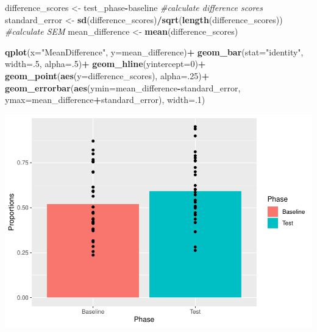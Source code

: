 \documentclass[]{book}
\newenvironment{Shaded}{\begin{snugshade}}{\end{snugshade}}
\newcommand{\KeywordTok}[1]{\textcolor[rgb]{0.13,0.29,0.53}{\textbf{#1}}}
\newcommand{\DataTypeTok}[1]{\textcolor[rgb]{0.13,0.29,0.53}{#1}}
\newcommand{\DecValTok}[1]{\textcolor[rgb]{0.00,0.00,0.81}{#1}}
\newcommand{\StringTok}[1]{\textcolor[rgb]{0.31,0.60,0.02}{#1}}
\newcommand{\CommentTok}[1]{\textcolor[rgb]{0.56,0.35,0.01}{\textit{#1}}}
\newcommand{\OperatorTok}[1]{\textcolor[rgb]{0.81,0.36,0.00}{\textbf{#1}}}
\newcommand{\NormalTok}[1]{#1}
\begin{document}
\begin{Shaded}
\begin{Highlighting}[]
\NormalTok{difference_scores <-}\StringTok{ }\NormalTok{test_phase}\OperatorTok{-}\NormalTok{baseline }\CommentTok{#calculate difference scores}
\NormalTok{standard_error <-}\StringTok{ }\KeywordTok{sd}\NormalTok{(difference_scores)}\OperatorTok{/}\KeywordTok{sqrt}\NormalTok{(}\KeywordTok{length}\NormalTok{(difference_scores)) }\CommentTok{#calculate SEM}
\NormalTok{mean_difference <-}\StringTok{ }\KeywordTok{mean}\NormalTok{(difference_scores)}

\KeywordTok{qplot}\NormalTok{(}\DataTypeTok{x=}\StringTok{"MeanDifference"}\NormalTok{, }\DataTypeTok{y=}\NormalTok{mean_difference)}\OperatorTok{+}
\StringTok{  }\KeywordTok{geom_bar}\NormalTok{(}\DataTypeTok{stat=}\StringTok{"identity"}\NormalTok{, }\DataTypeTok{width=}\NormalTok{.}\DecValTok{5}\NormalTok{, }\DataTypeTok{alpha=}\NormalTok{.}\DecValTok{5}\NormalTok{)}\OperatorTok{+}
\StringTok{  }\KeywordTok{geom_hline}\NormalTok{(}\DataTypeTok{yintercept=}\DecValTok{0}\NormalTok{)}\OperatorTok{+}
\StringTok{  }\KeywordTok{geom_point}\NormalTok{(}\KeywordTok{aes}\NormalTok{(}\DataTypeTok{y=}\NormalTok{difference_scores), }\DataTypeTok{alpha=}\NormalTok{.}\DecValTok{25}\NormalTok{)}\OperatorTok{+}
\StringTok{  }\KeywordTok{geom_errorbar}\NormalTok{(}\KeywordTok{aes}\NormalTok{(}\DataTypeTok{ymin=}\NormalTok{mean_difference}\OperatorTok{-}\NormalTok{standard_error, }
                                  \DataTypeTok{ymax=}\NormalTok{mean_difference}\OperatorTok{+}\NormalTok{standard_error), }\DataTypeTok{width=}\NormalTok{.}\DecValTok{1}\NormalTok{)}
\end{Highlighting}
\end{Shaded}

\includegraphics{Statistics_Lab_files/figure-latex/unnamed-chunk-178-1.pdf}
\end{document}
